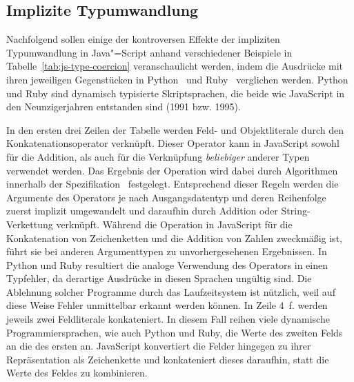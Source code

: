 \subsection{Implizite Typumwandlung}

Nachfolgend sollen einige der kontroversen Effekte der impliziten Typumwandlung in Java"=Script anhand verschiedener Beispiele in Tabelle~\ref{tab:js-type-coercion} veranschaulicht werden, indem die Ausdrücke mit ihren jeweiligen Gegenstücken in Python~\autocite{PYTHON3} und Ruby~\autocite{RUBY} verglichen werden. Python und Ruby sind dynamisch typisierte Skriptsprachen, die beide wie JavaScript in den Neunzigerjahren entstanden sind (1991 bzw. 1995).

In den ersten drei Zeilen der Tabelle werden Feld- und Objektliterale durch den Konkatenationsoperator \code{+} verknüpft. Dieser Operator kann in JavaScript sowohl für die Addition, als auch für die Verknüpfung \emph{beliebiger} anderer Typen verwendet werden. Das Ergebnis der Operation wird dabei durch Algorithmen innerhalb der Spezifikation~\autocite[220]{ECMASCRIPT:2019} festgelegt. Entsprechend dieser Regeln werden die Argumente des Operators je nach Ausgangsdatentyp und deren Reihenfolge zuerst implizit umgewandelt und daraufhin durch Addition oder String-Verkettung verknüpft. Während die Operation in JavaScript für die Konkatenation von Zeichenketten und die Addition von Zahlen zweckmäßig ist, führt sie bei anderen Argumenttypen zu unvorhergesehenen Ergebnissen. In Python und Ruby resultiert die analoge Verwendung des Operators in einen Typfehler, da derartige Ausdrücke in diesen Sprachen ungültig sind. Die Ablehnung solcher Programme durch das Laufzeitsystem ist nützlich, weil auf diese Weise Fehler unmittelbar erkannt werden können.
In Zeile 4~f. werden jeweils zwei Feldliterale konkateniert. In diesem Fall reihen viele dynamische Programmiersprachen, wie auch Python und Ruby, die Werte des zweiten Felds an die des ersten an. JavaScript konvertiert die Felder hingegen zu ihrer Repräsentation als Zeichenkette und konkateniert dieses daraufhin, statt die Werte des Feldes zu kombinieren.



